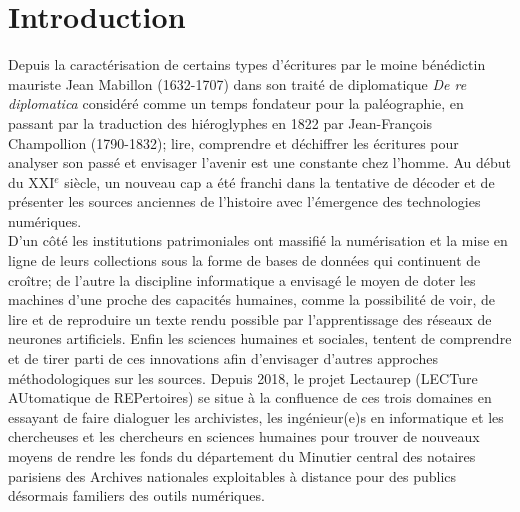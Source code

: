 \part*{Introduction}

Depuis la caractérisation de certains types d'écritures par le moine bénédictin mauriste Jean Mabillon (1632-1707) dans son traité de diplomatique \textit{De re diplomatica} considéré comme un temps fondateur pour la paléographie, en passant par la traduction des hiéroglyphes en 1822 par Jean-François Champollion (1790-1832); lire, comprendre et déchiffrer les écritures pour analyser son passé et envisager l'avenir est une constante chez l'homme. Au début du XXI$^{e}$ siècle, un nouveau cap a été franchi dans la tentative de décoder et de présenter les sources anciennes de l'histoire avec l'émergence des technologies numériques.\\

D'un côté les institutions patrimoniales ont massifié la numérisation et la mise en ligne de leurs collections sous la forme de bases de données qui continuent de croître; de l'autre la discipline informatique a envisagé le moyen de doter les machines d'une  proche des capacités humaines, comme la possibilité de voir, de lire et de reproduire un texte rendu possible par l'apprentissage des réseaux de neurones artificiels. Enfin les sciences humaines et sociales, tentent de comprendre et de tirer parti de ces innovations afin d'envisager d'autres approches méthodologiques sur les sources. Depuis 2018, le projet Lectaurep (LECTure AUtomatique de REPertoires) se situe à la confluence de ces trois domaines en essayant de faire dialoguer les archivistes, les ingénieur(e)s en informatique et les chercheuses et les chercheurs en sciences humaines pour trouver de nouveaux moyens de rendre les fonds du département du Minutier central des notaires parisiens des Archives nationales exploitables à distance pour des publics désormais familiers des outils numériques.\\

